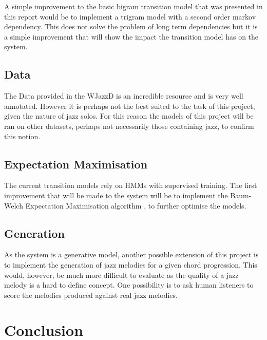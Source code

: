 \documentclass[bsc,singlespacing,parskip,deptreport,twoside,frontabs]{infthesis}
\begin{document}
A simple improvement to the basic bigram transition model that was presented in this report would be to implement a trigram model with a second order markov dependency. This does not solve the problem of long term dependencies but it is a simple improvement that will show the impact the transition model has on the system.

\section{Data}

The Data provided in the WJazzD is an incredible resource and is very well annotated. However it is perhaps not the best suited to the task of this project, given the nature of jazz solos. For this reason the models of this project will be ran on other datasets, perhaps not necessarily those containing jazz, to confirm this notion.

\section{Expectation Maximisation}

The current transition models rely on HMMs with supervised training. The first improvement that will be made to the system will be to implement the Baum-Welch Expectation Maximisation algorithm \cite[]{baum1970maximization}, to further optimise the models.

\section{Generation}

As the system is a generative model, another possible extension of this project is to implement the generation of jazz melodies for a given chord progression. This would, however, be much more difficult to evaluate as the quality of a jazz melody is a hard to define concept. One possibility is to ask human listeners to score the melodies produced against real jazz melodies.


\chapter{Conclusion}
\end{document}
